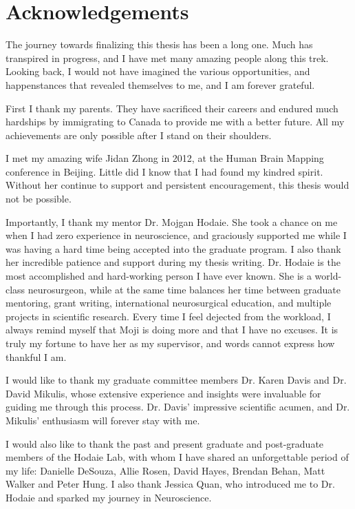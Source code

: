 \chapter{Acknowledgements}

The journey towards finalizing this thesis has been a long one. Much has transpired in progress, and I have met many amazing people along this trek. Looking back, I would not have imagined the various opportunities, and happenstances that revealed themselves to me, and I am forever grateful. 

First I thank my parents. They have sacrificed their careers and endured much hardships by immigrating to Canada to provide me with a better future. All my achievements are only possible after I stand on their shoulders. 

I met my amazing wife Jidan Zhong in 2012, at the Human Brain Mapping conference in Beijing. Little did I know that I had found my kindred spirit. Without her continue to support and persistent encouragement, this thesis would not be possible. 

Importantly, I thank my mentor Dr. Mojgan Hodaie. She took a chance on me when I had zero experience in neuroscience, and graciously supported me while I was having a hard time being accepted into the graduate program. I also thank her incredible patience and support during my thesis writing. Dr. Hodaie is the most accomplished and hard-working person I have ever known. She is a world-class neurosurgeon, while at the same time balances her time between graduate mentoring, grant writing, international neurosurgical education, and multiple projects in scientific research. Every time I feel dejected from the workload, I always remind myself that Moji is doing more and that I have no excuses. It is truly my fortune to have her as my supervisor, and words cannot express how thankful I am. 

I would like to thank my graduate committee members Dr. Karen Davis and Dr. David Mikulis, whose extensive experience and insights were invaluable for guiding me through this process. Dr. Davis' impressive scientific acumen, and Dr. Mikulis' enthusiasm will forever stay with me. 

I would also like to thank the past and present graduate and post-graduate members of the Hodaie Lab, with whom I have shared an unforgettable period of my life: Danielle DeSouza, Allie Rosen, David Hayes, Brendan Behan, Matt Walker and Peter Hung. I also thank Jessica Quan, who introduced me to Dr. Hodaie and sparked my journey in Neuroscience. 

